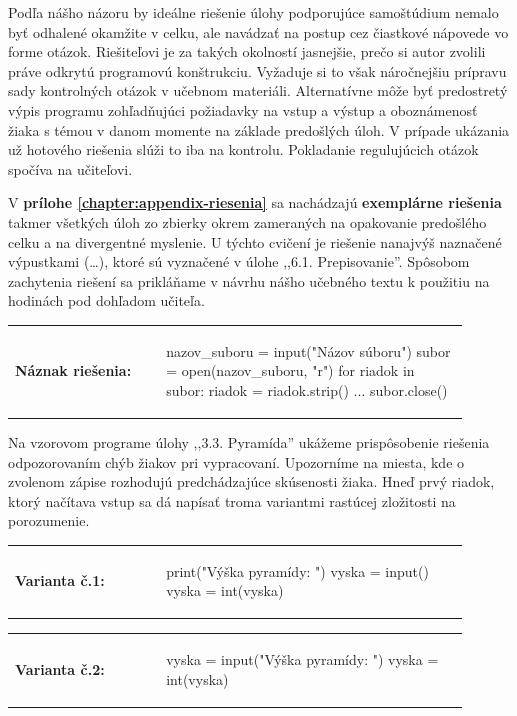 Podľa nášho názoru by ideálne riešenie úlohy podporujúce samoštúdium nemalo byť odhalené okamžite v celku, ale navádzať na postup cez čiastkové nápovede vo forme otázok. Riešiteľovi je za takých okolností jasnejšie, prečo si autor zvolili práve odkrytú programovú konštrukciu. Vyžaduje si to však náročnejšiu prípravu sady kontrolných otázok v učebnom materiáli. Alternatívne môže byť predostretý výpis programu zohľadňujúci požiadavky na vstup a výstup a oboznámenosť žiaka s témou v danom momente na základe predošlých úloh. V prípade ukázania už hotového riešenia slúži to iba na kontrolu. Pokladanie regulujúcich otázok spočíva na učiteľovi.

V \textbf{prílohe \ref{chapter:appendix-riesenia}} sa nachádzajú \textbf{exemplárne riešenia} takmer všetkých úloh zo zbierky okrem zameraných na opakovanie predošlého celku a na divergentné myslenie. U týchto cvičení je riešenie nanajvýš naznačené výpustkami (\dots), ktoré sú vyznačené v úlohe ,,6.1. Prepisovanie''. Spôsobom zachytenia riešení sa prikláňame v návrhu nášho učebného textu k použitiu na hodinách pod dohľadom učiteľa.

\begin{tabular}{@{}p{0.3\linewidth}p{0.6\linewidth}}
\textbf{\small Náznak riešenia:} &
\vspace{-1em}
\begin{solution}
nazov_suboru = input("Názov súboru")
subor = open(nazov_suboru, "r")
for riadok in subor:
   riadok = riadok.strip()
   ...
subor.close()
\end{solution}
\end{tabular}

Na vzorovom programe úlohy ,,3.3. Pyramída'' ukážeme prispôsobenie riešenia odpozorovaním chýb žiakov pri vypracovaní. Upozorníme na miesta, kde o zvolenom zápise rozhodujú predchádzajúce skúsenosti žiaka. Hneď prvý riadok, ktorý načítava vstup sa dá napísať troma variantmi rastúcej zložitosti na porozumenie.

\begin{tabular}{@{}p{0.3\linewidth}p{0.6\linewidth}}
\textbf{\small Varianta č.1:} &
\vspace{-1em}
\begin{solution}
print("Výška pyramídy: ")
vyska = input()
vyska = int(vyska)
\end{solution}
\end{tabular}

\vspace{-2em}
\begin{tabular}{@{}p{0.3\linewidth}p{0.6\linewidth}}
\textbf{\small Varianta č.2:} &
\vspace{-1em}
\begin{solution}
vyska = input("Výška pyramídy: ")
vyska = int(vyska)
\end{solution}
\end{tabular}

